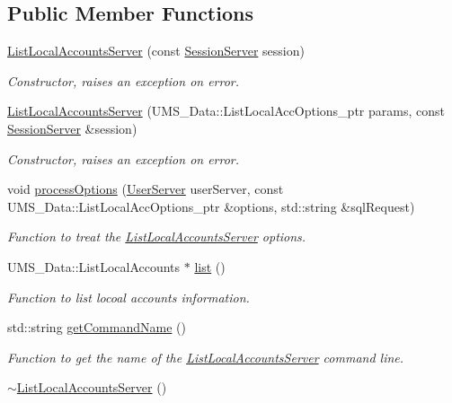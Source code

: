 \subsection*{Public Member Functions}
\begin{DoxyCompactItemize}
\item 
\hyperlink{classListLocalAccountsServer_a6ac7bb6958347ef75e3114c32a99d647}{ListLocalAccountsServer} (const \hyperlink{classSessionServer}{SessionServer} session)
\begin{DoxyCompactList}\small\item\em Constructor, raises an exception on error. \item\end{DoxyCompactList}\item 
\hyperlink{classListLocalAccountsServer_accde50c6113c2211eb62b8ee1a669612}{ListLocalAccountsServer} (UMS\_\-Data::ListLocalAccOptions\_\-ptr params, const \hyperlink{classSessionServer}{SessionServer} \&session)
\begin{DoxyCompactList}\small\item\em Constructor, raises an exception on error. \item\end{DoxyCompactList}\item 
void \hyperlink{classListLocalAccountsServer_add401d738d4c69fcafaa916e6744ce89}{processOptions} (\hyperlink{classUserServer}{UserServer} userServer, const UMS\_\-Data::ListLocalAccOptions\_\-ptr \&options, std::string \&sqlRequest)
\begin{DoxyCompactList}\small\item\em Function to treat the \hyperlink{classListLocalAccountsServer}{ListLocalAccountsServer} options. \item\end{DoxyCompactList}\item 
UMS\_\-Data::ListLocalAccounts $\ast$ \hyperlink{classListLocalAccountsServer_aab1471d2b577b25471f12652b6e78b31}{list} ()
\begin{DoxyCompactList}\small\item\em Function to list locoal accounts information. \item\end{DoxyCompactList}\item 
std::string \hyperlink{classListLocalAccountsServer_acc12358ea99501ac83097ed65570b3c0}{getCommandName} ()
\begin{DoxyCompactList}\small\item\em Function to get the name of the \hyperlink{classListLocalAccountsServer}{ListLocalAccountsServer} command line. \item\end{DoxyCompactList}\item 
\hypertarget{classListLocalAccountsServer_acc8b1730f88e33263b2ff5e057c3b6e7}{
\hyperlink{classListLocalAccountsServer_acc8b1730f88e33263b2ff5e057c3b6e7}{$\sim$ListLocalAccountsServer} ()}
\label{classListLocalAccountsServer_acc8b1730f88e33263b2ff5e057c3b6e7}


\end{DoxyCompactItemize}
